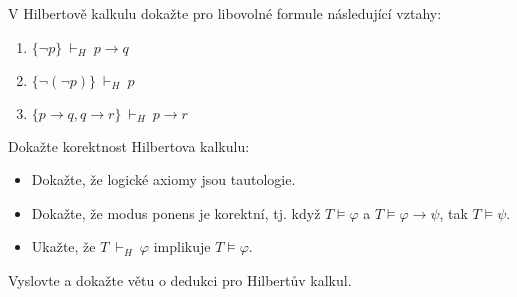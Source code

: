 \documentclass[a4paper,12pt]{article}
\begin{document}
    
    
    \medskip\begin{problem}
    V Hilbertově kalkulu dokažte pro libovolné formule následující vztahy:
    \begin{enumerate}
        \item $\{\neg p\}\ \vdash_H\ p\to q$
        \item $\{\neg(\neg p)\}\ \vdash_H\ p$
        \item $\{p\to q,q \to r\}\ \vdash_H\ p\to r$
    \end{enumerate}    
    \end{problem}
    
    \medskip\begin{problem}
        Dokažte korektnost Hilbertova kalkulu:
        \begin{itemize}
            \item Dokažte, že logické axiomy jsou tautologie.
            \item Dokažte, že modus ponens je korektní, tj. když $T\models\varphi$ a $T\models\varphi\to\psi$, tak $T\models\psi$.
            \item Ukažte, že $T\ \vdash_H\ \varphi$ implikuje $T\models\varphi$.
        \end{itemize}
        \end{problem}
        
    \medskip\begin{problem}
        Vyslovte a dokažte větu o dedukci pro Hilbertův kalkul.
    \end{problem}
       
\end{document}
